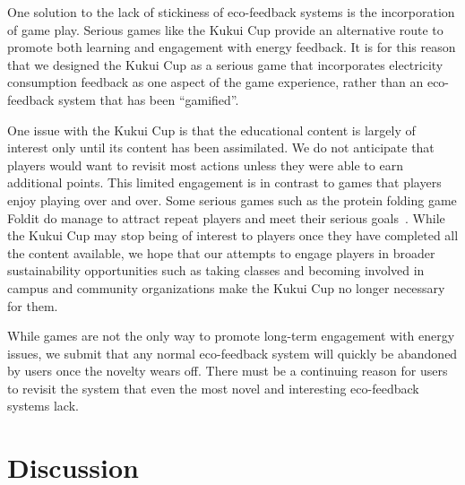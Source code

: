 \documentclass{sigchi}
\begin{document}
One solution to the lack of stickiness of eco-feedback systems is the incorporation of game play. Serious games like the Kukui Cup provide an alternative route to promote both learning and engagement with energy feedback. It is for this reason that we designed the Kukui Cup as a serious game that incorporates electricity consumption feedback as one aspect of the game experience, rather than an eco-feedback system that has been ``gamified''. 

One issue with the Kukui Cup is that the educational content is largely of interest only until its content has been assimilated. We do not anticipate that players would want to revisit most actions unless they were able to earn additional points. This limited engagement is in contrast to games that players enjoy playing over and over. Some serious games such as the protein folding game Foldit do manage to attract repeat players and meet their serious goals~\cite{Khatib2011}. While the Kukui Cup may stop being of interest to players once they have completed all the content available, we hope that our attempts to engage players in broader sustainability opportunities such as taking classes and becoming involved in campus and community organizations make the Kukui Cup no longer necessary for them.

While games are not the only way to promote long-term engagement with energy issues, we submit that any normal eco-feedback system will quickly be abandoned by users once the novelty wears off. There must be a continuing reason for users to revisit the system that even the most novel and interesting eco-feedback systems lack.


\section{Discussion}
\end{document}
